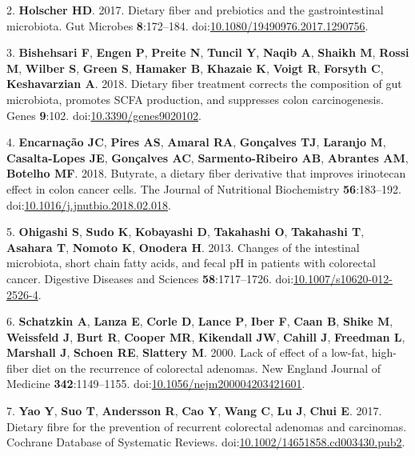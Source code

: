\documentclass[11pt,]{article}
\begin{document}
\hypertarget{ref-Holscher2017}{}
2. \textbf{Holscher HD}. 2017. Dietary fiber and prebiotics and the
gastrointestinal microbiota. Gut Microbes \textbf{8}:172--184.
doi:\href{https://doi.org/10.1080/19490976.2017.1290756}{10.1080/19490976.2017.1290756}.

\hypertarget{ref-Bishehsari2018}{}
3. \textbf{Bishehsari F}, \textbf{Engen P}, \textbf{Preite N},
\textbf{Tuncil Y}, \textbf{Naqib A}, \textbf{Shaikh M}, \textbf{Rossi
M}, \textbf{Wilber S}, \textbf{Green S}, \textbf{Hamaker B},
\textbf{Khazaie K}, \textbf{Voigt R}, \textbf{Forsyth C},
\textbf{Keshavarzian A}. 2018. Dietary fiber treatment corrects the
composition of gut microbiota, promotes SCFA production, and suppresses
colon carcinogenesis. Genes \textbf{9}:102.
doi:\href{https://doi.org/10.3390/genes9020102}{10.3390/genes9020102}.

\hypertarget{ref-Encarnao2018}{}
4. \textbf{Encarnação JC}, \textbf{Pires AS}, \textbf{Amaral RA},
\textbf{Gonçalves TJ}, \textbf{Laranjo M}, \textbf{Casalta-Lopes JE},
\textbf{Gonçalves AC}, \textbf{Sarmento-Ribeiro AB}, \textbf{Abrantes
AM}, \textbf{Botelho MF}. 2018. Butyrate, a dietary fiber derivative
that improves irinotecan effect in colon cancer cells. The Journal of
Nutritional Biochemistry \textbf{56}:183--192.
doi:\href{https://doi.org/10.1016/j.jnutbio.2018.02.018}{10.1016/j.jnutbio.2018.02.018}.

\hypertarget{ref-Ohigashi2013}{}
5. \textbf{Ohigashi S}, \textbf{Sudo K}, \textbf{Kobayashi D},
\textbf{Takahashi O}, \textbf{Takahashi T}, \textbf{Asahara T},
\textbf{Nomoto K}, \textbf{Onodera H}. 2013. Changes of the intestinal
microbiota, short chain fatty acids, and fecal pH in patients with
colorectal cancer. Digestive Diseases and Sciences
\textbf{58}:1717--1726.
doi:\href{https://doi.org/10.1007/s10620-012-2526-4}{10.1007/s10620-012-2526-4}.

\hypertarget{ref-Schatzkin2000}{}
6. \textbf{Schatzkin A}, \textbf{Lanza E}, \textbf{Corle D},
\textbf{Lance P}, \textbf{Iber F}, \textbf{Caan B}, \textbf{Shike M},
\textbf{Weissfeld J}, \textbf{Burt R}, \textbf{Cooper MR},
\textbf{Kikendall JW}, \textbf{Cahill J}, \textbf{Freedman L},
\textbf{Marshall J}, \textbf{Schoen RE}, \textbf{Slattery M}. 2000. Lack
of effect of a low-fat, high-fiber diet on the recurrence of colorectal
adenomas. New England Journal of Medicine \textbf{342}:1149--1155.
doi:\href{https://doi.org/10.1056/nejm200004203421601}{10.1056/nejm200004203421601}.

\hypertarget{ref-Yao2017}{}
7. \textbf{Yao Y}, \textbf{Suo T}, \textbf{Andersson R}, \textbf{Cao Y},
\textbf{Wang C}, \textbf{Lu J}, \textbf{Chui E}. 2017. Dietary fibre for
the prevention of recurrent colorectal adenomas and carcinomas. Cochrane
Database of Systematic Reviews.
doi:\href{https://doi.org/10.1002/14651858.cd003430.pub2}{10.1002/14651858.cd003430.pub2}.
\end{document}
